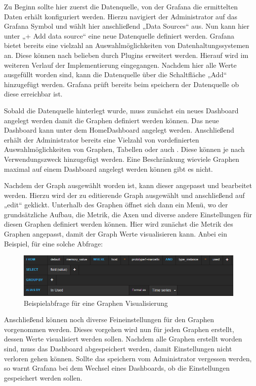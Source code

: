 Zu Beginn sollte hier zuerst die Datenquelle, von der Grafana die ermittelten
Daten erhält konfiguriert werden. Hierzu navigiert der Administrator auf das
Grafana Symbol und wählt hier anschließend „Data Sources“ aus. Nun kann hier
unter „+ Add data source“ eine neue Datenquelle definiert werden. Grafana
bietet bereits eine vielzahl an Auswahlmöglichkeiten von Datenhaltungssystemen
an. Diese können nach belieben durch Plugins erweitert werden. Hierauf wird im
weiteren Verlauf der Implementierung eingegangen. Nachdem hier alle Werte
ausgefüllt worden sind, kann die Datenquelle über die Schaltfläche „Add“
hinzugefügt werden. Grafana prüft bereits beim speichern der Datenquelle ob
diese erreichbar ist.

Sobald die Datenquelle hinterlegt wurde, muss zunächst ein neues Dashboard
angelegt werden damit die Graphen definiert werden können. Das neue Dashboard
kann unter dem HomeDashboard angelegt werden. Anschließend erhält der
Administrator bereits eine Vielzahl von vordefinierten Auswahlmöglichkeiten von
Graphen, Tabellen oder auch . Diese können je
nach Verwendungszweck hinzugefügt werden. Eine Beschränkung wieviele Graphen
maximal auf einem Dashboard angelegt werden können gibt es nicht.

Nachdem der Graph ausgewählt worden ist, kann dieser angepasst und bearbeitet
werden. Hierzu wird der zu editierende Graph ausgewählt und anschließend auf
„edit“ geklickt. Unterhalb des Graphen öffnet sich dann ein Menü, wo der
grundsätzliche Aufbau, die Metrik, die Axen und diverse andere Einstellungen
für diesen Graphen definiert werden können. Hier wird zunächst die Metrik des
Graphen angepasst, damit der Graph Werte visualisieren kann.  Anbei ein
Beispiel, für eine solche Abfrage:

\begin{figure}[h]
  \centering
  \includegraphics[width=1.0\textwidth]{../figures/graph.png}
  \caption{Beispielabfrage für eine Graphen Visualisierung}
\label{figure:graph}
\end{figure}

Anschließend können noch diverse Feineinstellungen für den Graphen vorgenommen
werden. Dieses vorgehen wird nun für jeden Graphen erstellt, dessen Werte
visualisiert werden sollen. Nachdem alle Graphen erstellt worden sind, muss das
Dashboard abgespeichert werden, damit Einstellungen nicht verloren gehen
können. Sollte das speichern vom Administrator vergessen werden, so warnt
Grafana bei dem Wechsel eines Dashboards, ob die Einstellungen gespeichert
werden sollen.

